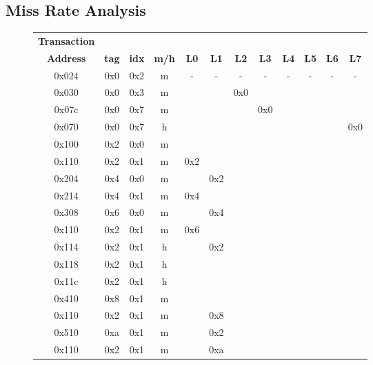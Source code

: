 \documentclass[10pt]{article}
\begin{document}
\subsection{Miss Rate Analysis}
\begin{figure}[H]
\centering
\begin{tabular}{@{\extracolsep{3pt}}cccccccccccc@{}}
\Xhline{2\arrayrulewidth}
\textbf{Transaction} & & & & & & & & & & & \\
\textbf{Address} & \textbf{tag} & \textbf{idx} & \textbf{m/h} & \textbf{L0} & \textbf{L1} & \textbf{L2} & \textbf{L3} & \textbf{L4} & \textbf{L5} & \textbf{L6} & \textbf{L7}\\
\Xhline{2\arrayrulewidth}
0x024 & 0x0 & 0x2 & m &  -  &  -  &  -  &  -  &  -  &  -  &  -  &  -  \\
0x030 & 0x0 & 0x3 & m &     &     & 0x0 &     &     &     &     &     \\
0x07c & 0x0 & 0x7 & m &     &     &     & 0x0 &     &     &     &     \\
0x070 & 0x0 & 0x7 & h &     &     &     &     &     &     &     & 0x0 \\
0x100 & 0x2 & 0x0 & m &     &     &     &     &     &     &     &     \\
0x110 & 0x2 & 0x1 & m & 0x2 &     &     &     &     &     &     &     \\
0x204 & 0x4 & 0x0 & m &     & 0x2 &     &     &     &     &     &     \\
0x214 & 0x4 & 0x1 & m & 0x4 &     &     &     &     &     &     &     \\
0x308 & 0x6 & 0x0 & m &     & 0x4 &     &     &     &     &     &     \\
0x110 & 0x2 & 0x1 & m & 0x6 &     &     &     &     &     &     &     \\
0x114 & 0x2 & 0x1 & h &     & 0x2 &     &     &     &     &     &     \\
0x118 & 0x2 & 0x1 & h &     &     &     &     &     &     &     &     \\
0x11c & 0x2 & 0x1 & h &     &     &     &     &     &     &     &     \\
0x410 & 0x8 & 0x1 & m &     &     &     &     &     &     &     &     \\
0x110 & 0x2 & 0x1 & m &     & 0x8 &     &     &     &     &     &     \\
0x510 & 0xa & 0x1 & m &     & 0x2 &     &     &     &     &     &     \\
0x110 & 0x2 & 0x1 & m &     & 0xa &     &     &     &     &     &     \\

\end{tabular}
\end{figure}
\end{document}
